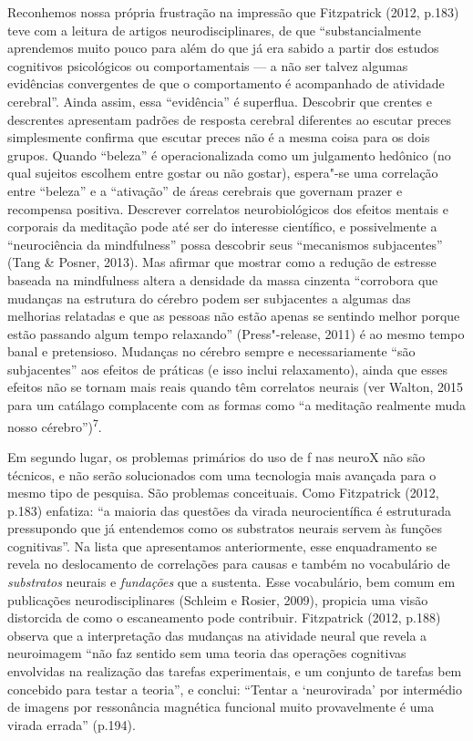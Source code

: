 Reconhemos nossa própria frustração na impressão que Fitzpatrick (2012,
p.183) teve com a leitura de artigos neurodisciplinares, de que
``substancialmente aprendemos muito pouco para além do que já era sabido
a partir dos estudos cognitivos psicológicos ou comportamentais --- a
não ser talvez algumas evidências convergentes de que o comportamento é
acompanhado de atividade cerebral''. Ainda assim, essa ``evidência'' é
superflua. Descobrir que crentes e descrentes apresentam padrões de
resposta cerebral diferentes ao escutar preces simplesmente confirma que
escutar preces não é a mesma coisa para os dois grupos. Quando
``beleza'' é operacionalizada como um julgamento hedônico (no qual
sujeitos escolhem entre gostar ou não gostar), espera"-se uma correlação
entre ``beleza'' e a ``ativação'' de áreas cerebrais que governam prazer
e recompensa positiva. Descrever correlatos neurobiológicos dos efeitos
mentais e corporais da meditação pode até ser do interesse científico, e
possivelmente a ``neurociência da mindfulness'' possa descobrir seus
``mecanismos subjacentes'' (Tang \& Posner, 2013). Mas afirmar que
mostrar como a redução de estresse baseada na mindfulness altera a
densidade da massa cinzenta ``corrobora que mudanças na estrutura do
cérebro podem ser subjacentes a algumas das melhorias relatadas e que as
pessoas não estão apenas se sentindo melhor porque estão passando algum
tempo relaxando'' (Press"-release, 2011) é ao mesmo tempo banal e
pretensioso. Mudanças no cérebro sempre e necessariamente ``são
subjacentes'' aos efeitos de práticas (e isso inclui relaxamento), ainda
que esses efeitos não se tornam mais reais quando têm correlatos neurais
(ver Walton, 2015 para um catálago complacente com as formas como ``a
meditação realmente muda nosso cérebro'')\textsuperscript{7}.

Em segundo lugar, os problemas primários do uso de f nas neuroX não
são técnicos, e não serão solucionados com uma tecnologia mais avançada
para o mesmo tipo de pesquisa. São problemas conceituais. Como
Fitzpatrick (2012, p.183) enfatiza: ``a maioria das questões da virada
neurocientífica é estruturada pressupondo que já entendemos como os
substratos neurais servem às funções cognitivas''. Na lista que
apresentamos anteriormente, esse enquadramento se revela no deslocamento
de correlações para causas e também no vocabulário de \emph{substratos}
neurais e \emph{fundações} que a sustenta. Esse vocabulário, bem comum
em publicações neurodisciplinares (Schleim e Rosier, 2009), propicia uma
visão distorcida de como o escaneamento pode contribuir. Fitzpatrick
(2012, p.188) observa que a interpretação das mudanças na atividade
neural que revela a neuroimagem ``não faz sentido sem uma teoria das
operações cognitivas envolvidas na realização das tarefas experimentais,
e um conjunto de tarefas bem concebido para testar a teoria'', e
conclui: ``Tentar a `neurovirada' por intermédio de imagens por
ressonância magnética funcional muito provavelmente é uma virada
errada'' (p.194).

